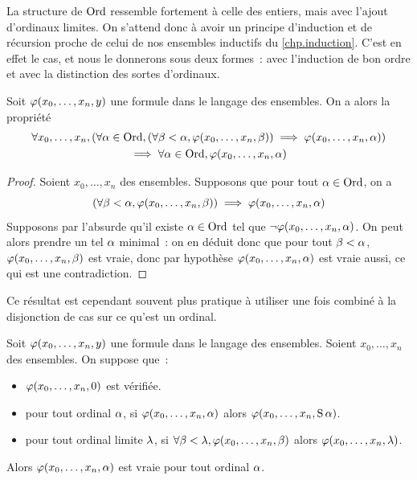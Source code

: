 La structure de $\operatorname{Ord}$ ressemble fortement à celle des entiers, mais avec
l'ajout d'ordinaux limites. On s'attend donc à avoir un principe d'induction et
de récursion proche de celui de nos ensembles inductifs du \cref{chp.induction}.
C'est en effet le cas, et nous le donnerons sous deux formes~: avec l'induction
de bon ordre et avec la distinction des sortes d'ordinaux.

\begin{theorem}
  Soit $\varphi(x_0,\ldots,x_n,y)$ une formule dans le langage des ensembles.
  On a alors la propriété
  \begin{multline*}
    \forall x_0,\ldots,x_n,(\forall \alpha\in\operatorname{Ord},
    (\forall \beta < \alpha, \varphi(x_0,\ldots,x_n,\beta))\implies
    \varphi(x_0,\ldots,x_n,\alpha))\\
    \implies \forall \alpha \in \operatorname{Ord}, \varphi(x_0,\ldots,x_n,\alpha)
  \end{multline*}
\end{theorem}

\begin{proof}
  Soient $x_0,\ldots,x_n$ des ensembles. Supposons que pour tout
  $\alpha\in\operatorname{Ord}$, on a
  \[(\forall \beta < \alpha, \varphi(x_0,\ldots,x_n,\beta))\implies
  \varphi(x_0,\ldots,x_n,\alpha)\]
  Supposons par l'absurde qu'il existe $\alpha \in \operatorname{Ord}$ tel que
  $\lnot\varphi(x_0,\ldots,x_n,\alpha)$. On peut alors prendre un tel $\alpha$
  minimal~: on en déduit donc que pour tout $\beta < \alpha$,
  $\varphi(x_0,\ldots,x_n,\beta)$ est vraie, donc par hypothèse
  $\varphi(x_0,\ldots,x_n,\alpha)$ est vraie aussi, ce qui est une
  contradiction.
\end{proof}

Ce résultat est cependant souvent plus pratique à utiliser une fois combiné à la
disjonction de cas sur ce qu'est un ordinal.

\begin{proposition}
  Soit $\varphi(x_0,\ldots,x_n,y)$ une formule dans le langage des ensembles.
  Soient $x_0,\ldots,x_n$ des ensembles. On suppose que~:
  \begin{itemize}
  \item $\varphi(x_0,\ldots,x_n,0)$ est vérifiée.
  \item pour tout ordinal $\alpha$, si $\varphi(x_0,\ldots,x_n,\alpha)$ alors
    $\varphi(x_0,\ldots,x_n,\operatorname{S}\alpha)$.
  \item pour tout ordinal limite $\lambda$, si
    $\forall \beta < \lambda, \varphi(x_0,\ldots,x_n,\beta)$ alors
    $\varphi(x_0,\ldots,x_n,\lambda)$.
  \end{itemize}

  Alors $\varphi(x_0,\ldots,x_n,\alpha)$ est vraie pour tout ordinal $\alpha$.
\end{proposition}

